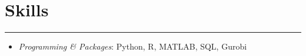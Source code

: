 \documentclass[12pt, a4paper]{article}
\begin{document}
{%

\section*{Skills}
\vspace*{0.4em}
\hrule height 0.5pt
\begin{itemize}[leftmargin=36pt, itemsep=2pt, parsep=0.2pt, topsep=1pt]

	\item {\it Programming \& Packages}: Python, R, MATLAB, SQL, Gurobi

\end{itemize}
}



\end{document}
